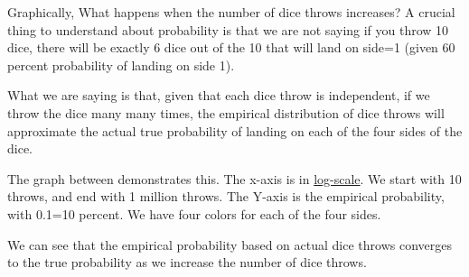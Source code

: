 \documentclass[
]{book}
\begin{document}
Graphically, What happens when the number of dice throws increases? A crucial thing to understand about probability is that we are not saying if you throw 10 dice, there will be exactly 6 dice out of the 10 that will land on side=1 (given 60 percent probability of landing on side 1).

What we are saying is that, given that each dice throw is independent, if we throw the dice many many times, the empirical distribution of dice throws will approximate the actual true probability of landing on each of the four sides of the dice.

The graph between demonstrates this. The x-axis is in \href{https://en.wikipedia.org/wiki/Logarithmic_scale}{log-scale}. We start with 10 throws, and end with 1 million throws. The Y-axis is the empirical probability, with 0.1=10 percent. We have four colors for each of the four sides.

We can see that the empirical probability based on actual dice throws converges to the true probability as we increase the number of dice throws.
\end{document}
